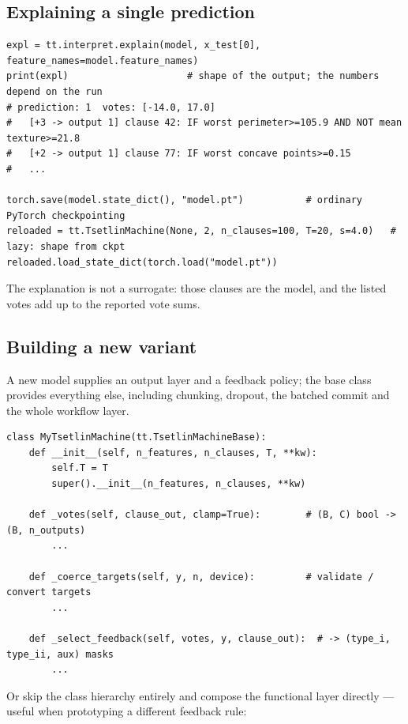\subsection{Explaining a single prediction}

\begin{lstlisting}[style=ttpython]
expl = tt.interpret.explain(model, x_test[0], feature_names=model.feature_names)
print(expl)                     # shape of the output; the numbers depend on the run
# prediction: 1  votes: [-14.0, 17.0]
#   [+3 -> output 1] clause 42: IF worst perimeter>=105.9 AND NOT mean texture>=21.8
#   [+2 -> output 1] clause 77: IF worst concave points>=0.15
#   ...

torch.save(model.state_dict(), "model.pt")           # ordinary PyTorch checkpointing
reloaded = tt.TsetlinMachine(None, 2, n_clauses=100, T=20, s=4.0)   # lazy: shape from ckpt
reloaded.load_state_dict(torch.load("model.pt"))
\end{lstlisting}

The explanation is not a surrogate: those clauses are the model, and the listed votes add up
to the reported vote sums.

\subsection{Building a new variant}

A new model supplies an output layer and a feedback policy; the base class provides
everything else, including chunking, dropout, the batched commit and the whole workflow
layer.

\begin{lstlisting}[style=ttpython]
class MyTsetlinMachine(tt.TsetlinMachineBase):
    def __init__(self, n_features, n_clauses, T, **kw):
        self.T = T
        super().__init__(n_features, n_clauses, **kw)

    def _votes(self, clause_out, clamp=True):        # (B, C) bool -> (B, n_outputs)
        ...

    def _coerce_targets(self, y, n, device):         # validate / convert targets
        ...

    def _select_feedback(self, votes, y, clause_out):  # -> (type_i, type_ii, aux) masks
        ...
\end{lstlisting}

Or skip the class hierarchy entirely and compose the functional layer directly --- useful when
prototyping a different feedback rule:

